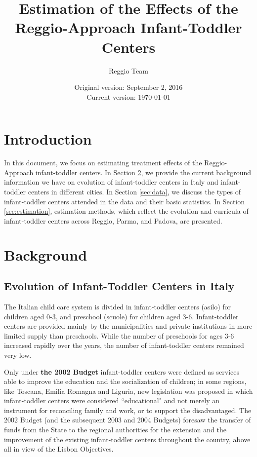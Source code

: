 



\title{Estimation of the Effects of the Reggio-Approach Infant-Toddler Centers}
\author{Reggio Team}
\date{Original version: September 2, 2016 \\ Current version: \today}
\maketitle

\doublespacing

\section{Introduction}
In this document, we focus on estimating treatment effects of the Reggio-Approach infant-toddler centers. In Section \ref{sec:background}, we provide the current background information we have on evolution of infant-toddler centers in Italy and infant-toddler centers in different cities. In Section \ref{sec:data}, we discuss the types of infant-toddler centers attended in the data and their basic statistics. In Section \ref{sec:estimation}, estimation methods, which reflect the evolution and curricula of infant-toddler centers across Reggio, Parma, and Padova, are presented.


\section{Background} \label{sec:background}
\subsection{Evolution of Infant-Toddler Centers in Italy}
The Italian child care system is divided in infant-toddler centers (asilo) for children aged 0-3, and preschool (scuole) for children aged 3-6. Infant-toddler centers are provided mainly by the municipalities and private institutions in more limited supply than preschools. While the number of preschools for ages 3-6 increased rapidly over the years, the number of infant-toddler centers remained very low.  

Only under \textbf{the 2002 Budget} infant-toddler centers were defined as services able to improve the education and the socialization of children; in some regions, like Toscana, Emilia Romagna and Liguria, new legislation was proposed in which infant-toddler centers were considered ``educational" and not merely an instrument for reconciling family and work, or to support the disadvantaged. The 2002 Budget (and the subsequent 2003 and 2004 Budgets) foresaw the transfer of funds from the State to the regional authorities for the extension and the improvement of the existing infant-toddler centers throughout the country, above all in view of the Lisbon Objectives. 

